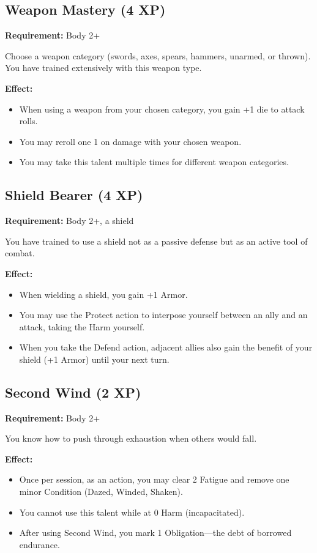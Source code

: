 \subsection{Weapon Mastery (4 XP)}

\textbf{Requirement:} Body 2+

Choose a weapon category (swords, axes, spears, hammers, unarmed, or thrown). You have trained extensively with this weapon type.

\textbf{Effect:}
\begin{itemize}
\item When using a weapon from your chosen category, you gain +1 die to attack rolls.
\item You may reroll one 1 on damage with your chosen weapon.
\item You may take this talent multiple times for different weapon categories.
\end{itemize}

\subsection{Shield Bearer (4 XP)}

\textbf{Requirement:} Body 2+, a shield

You have trained to use a shield not as a passive defense but as an active tool of combat.

\textbf{Effect:}
\begin{itemize}
\item When wielding a shield, you gain +1 Armor.
\item You may use the Protect action to interpose yourself between an ally and an attack, taking the Harm yourself.
\item When you take the Defend action, adjacent allies also gain the benefit of your shield (+1 Armor) until your next turn.
\end{itemize}

\subsection{Second Wind (2 XP)}

\textbf{Requirement:} Body 2+

You know how to push through exhaustion when others would fall.

\textbf{Effect:}
\begin{itemize}
\item Once per session, as an action, you may clear 2 Fatigue and remove one minor Condition (Dazed, Winded, Shaken).
\item You cannot use this talent while at 0 Harm (incapacitated).
\item After using Second Wind, you mark 1 Obligation—the debt of borrowed endurance.
\end{itemize}

